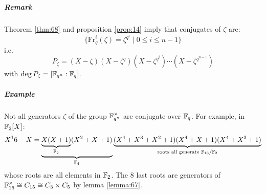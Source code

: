 \subparagraph{Remark}

Theorem \ref{thm:68} and proposition \ref{prop:14} imply that conjugates of $\zeta$ are:
\begin{equation*}
  \{ \text{Fr}_q^i(\zeta) = \zeta^{q^i} \mid 0 \leq i \leq n-1 \}
\end{equation*}
i.e.
\begin{equation*}
  P_\zeta = (X-\zeta)(X-\zeta^q)(X-\zeta^{q^i})\cdots(X-\zeta^{q^{n-1}})
\end{equation*}
with $\deg P_\zeta = [\mathbb{F}_{q^n} : \mathbb{F}_{q}]$.

\subparagraph{Example}

Not all generators $\zeta$ of the group $\mathbb{F}_{q^n}^\times$ are conjugate over $\mathbb{F}_{q}$. For example, in $\mathbb{F}_{2}[X]$:
\begin{equation*}
  X^16 - X = \underbrace{\underbrace{X(X+1)}_{\mathbb{F}_{2}}(X^2+X+1)}_{\mathbb{F}_{4}}\underbrace{(X^4+X^3+X^2+1)(X^4+X+1)(X^4+X^3+1)}_{\text{roots all generate } \mathbb{F}_{16}/\mathbb{F}_{2}}
\end{equation*}
whose roots are all elements in $\mathbb{F}_{2}$. The 8 last roots are generators of $\mathbb{F}_{16}^\times \cong C_{15} \cong C_3 \times C_5$ by lemma \ref{lemma:67}.


